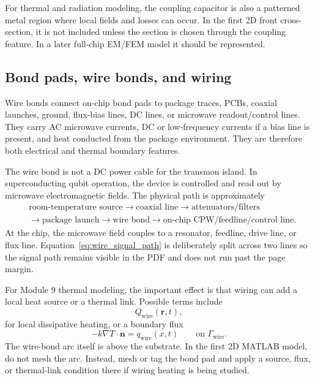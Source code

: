 \documentclass[11pt]{article}
\begin{document}
For thermal and radiation modeling, the coupling capacitor is also a patterned metal region where local fields and losses can occur. In the first 2D front cross-section, it is not included unless the section is chosen through the coupling feature. In a later full-chip EM/FEM model it should be represented.

\subsection{Bond pads, wire bonds, and wiring}
Wire bonds connect on-chip bond pads to package traces, PCBs, coaxial launches, ground, flux-bias lines, DC lines, or microwave readout/control lines. They carry AC microwave currents, DC or low-frequency currents if a bias line is present, and heat conducted from the package environment. They are therefore both electrical and thermal boundary features.

The wire bond is not a DC power cable for the transmon island. In superconducting qubit operation, the device is controlled and read out by microwave electromagnetic fields. The physical path is approximately
\begin{equation}
\begin{aligned}
&\text{room-temperature source}
\rightarrow \text{coaxial line}
\rightarrow \text{attenuators/filters} \\
&\rightarrow \text{package launch}
\rightarrow \text{wire bond}
\rightarrow \text{on-chip CPW/feedline/control line}.
\end{aligned}
\label{eq:wire_signal_path}
\end{equation}
At the chip, the microwave field couples to a resonator, feedline, drive line, or flux line. Equation~\eqref{eq:wire_signal_path} is deliberately split across two lines so the signal path remains visible in the PDF and does not run past the page margin.

For Module 9 thermal modeling, the important effect is that wiring can add a local heat source or a thermal link. Possible terms include
\begin{equation}
    Q_{\mathrm{wire}}(\mathbf{r},t),
    \label{eq:qwire}
\end{equation}
for local dissipative heating, or a boundary flux
\begin{equation}
    -k\nabla T\cdot\mathbf{n} = q_{\mathrm{wire}}(x,t)
    \qquad \text{on } \Gamma_{\mathrm{wire}}.
    \label{eq:wire_flux}
\end{equation}
The wire-bond arc itself is above the substrate. In the first 2D MATLAB model, do not mesh the arc. Instead, mesh or tag the bond pad and apply a source, flux, or thermal-link condition there if wiring heating is being studied.
\end{document}
